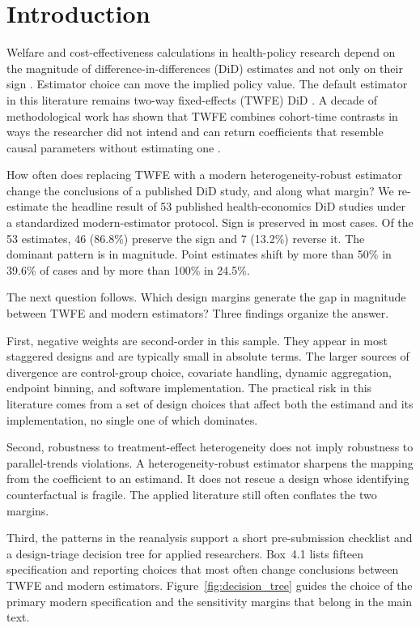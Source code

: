 \chapter{Introduction}
\label{Chapter1}

Welfare and cost-effectiveness calculations in health-policy research depend on the magnitude of difference-in-differences (DiD) estimates and not only on their sign \parencite{hendren2020unified,finkelstein2020welfare}. Estimator choice can move the implied policy value. The default estimator in this literature remains two-way fixed-effects (TWFE) DiD \parencite{angrist2010credibility}. A decade of methodological work has shown that TWFE combines cohort-time contrasts in ways the researcher did not intend and can return coefficients that resemble causal parameters without estimating one \parencite{goodman2021difference,dechaisemartin2020twfe,callaway2021difference,roth2023s}.

How often does replacing TWFE with a modern heterogeneity-robust estimator change the conclusions of a published DiD study, and along what margin? We re-estimate the headline result of 53 published health-economics DiD studies under a standardized modern-estimator protocol. Sign is preserved in most cases. Of the 53 estimates, 46 (86.8\%) preserve the sign and 7 (13.2\%) reverse it. The dominant pattern is in magnitude. Point estimates shift by more than 50\% in 39.6\% of cases and by more than 100\% in 24.5\%.

The next question follows. Which design margins generate the gap in magnitude between TWFE and modern estimators? Three findings organize the answer.

First, negative weights are second-order in this sample. They appear in most staggered designs and are typically small in absolute terms. The larger sources of divergence are control-group choice, covariate handling, dynamic aggregation, endpoint binning, and software implementation. The practical risk in this literature comes from a set of design choices that affect both the estimand and its implementation, no single one of which dominates.

Second, robustness to treatment-effect heterogeneity does not imply robustness to parallel-trends violations. A heterogeneity-robust estimator sharpens the mapping from the coefficient to an estimand. It does not rescue a design whose identifying counterfactual is fragile. The applied literature still often conflates the two margins.

Third, the patterns in the reanalysis support a short pre-submission checklist and a design-triage decision tree for applied researchers. Box~4.1 lists fifteen specification and reporting choices that most often change conclusions between TWFE and modern estimators. Figure~\ref{fig:decision_tree} guides the choice of the primary modern specification and the sensitivity margins that belong in the main text.


